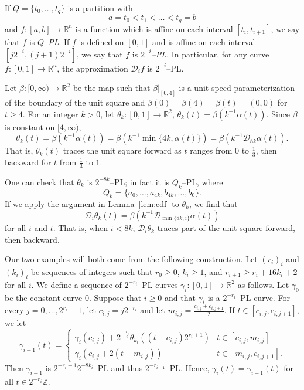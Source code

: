\documentclass[12pt,reqno]{amsart}
\newcommand{\cD}{\mathcal{D}}
\newcommand{\R}{\mathbb{R}}
\newcommand{\Z}{\mathbb{Z}}
\newcommand{\from}{\colon}
\theoremstyle{remark}
\newcommand{\0}{\mathbf{0}}
\renewcommand{\1}{\mathbf 1}
\begin{document}
If $Q = \{t_0,\dots, t_q\}$ is a partition with $$a = t_0 < t_1 <\dots  < t_q = b$$ and $f\from [a,b]\to \R^n$ is a function which is affine on each interval $[t_i,t_{i+1}]$, we say that $f$ is \emph{$Q$--PL}. If $f$ is defined on $[0,1]$ and is affine on each interval $[j2^{-i},(j+1)2^{-i}]$, we say that $f$ is \emph{$2^{-i}$--PL}. In particular, for any curve $f\from [0,1]\to \R^n$, the approximation $\cD_if$ is $2^{-i}$--PL.

Let $\beta\from [0,\infty)\to \R^2$ be the map such that $\beta|_{[0,4]}$ is a unit-speed parameterization of the boundary of the unit square and $\beta(0)=\beta(4) = \beta(t) = (0,0)$ for $t \ge 4$. For an integer $k > 0$, let $\theta_k \from [0,1]\to \R^2$, $\theta_k(t) = \beta(k^{-1} \alpha(t))$. Since $\beta$ is constant on $[4,\infty)$, 
\begin{equation}\label{eq:thetak}
  \theta_k(t) = \beta(k^{-1} \alpha(t)) = \beta(k^{-1} \min\{4k,\alpha(t)\}) = \beta(k^{-1} \cD_{8k}\alpha(t)).
\end{equation}
That is, $\theta_k(t)$ traces the unit square forward as $t$ ranges from $0$ to $\frac{1}{3}$, then backward for $t$ from $\frac{1}{3}$ to $1$.

One can check that $\theta_k$ is $2^{-8k}$--PL; in fact it is $Q_k$--PL, where
$$Q_k = \{a_0,\dots, a_{4k}, b_{4k},\dots, b_0\}.$$
If we apply the argument in Lemma~\ref{lem:cdf} to $\theta_k$, we find that
\begin{equation}\label{eq:cdtheta}
  \cD_i \theta_k(t) = \beta(k^{-1} \cD_{\min\{8k,i\}}\alpha(t))
\end{equation}
for all $i$ and $t$. That is, when $i < 8k$, $\cD_i \theta_k$ traces part of the unit square forward, then backward. 

Our two examples will both come from the following construction.
Let $(r_i)_i$ and $(k_i)_i$ be sequences of integers such that $r_0 \ge 0$, $k_i \ge 1$, and $r_{i+1} \ge r_i + 16 k_i + 2$ for all $i$. We define a sequence of $2^{-r_i}$--PL curves $\gamma_i\from [0,1]\to \R^2$ as follows.
Let $\gamma_0$ be the constant curve $0$. Suppose that $i\ge 0$ and that $\gamma_i$ is a $2^{-r_i}$--PL curve. For every 
$j=0,\dots, 2^{r_i}-1$, let $c_{i,j} = j 2^{-r_i}$ and let $m_{i,j} = \frac{c_{i,j}+ c_{i,j+1}}{2}$. If $t\in [c_{i,j},c_{i,j+1}]$, we let
\begin{equation}\label{eqn:defgammai}
\gamma_{i+1}(t) =
\begin{cases}
  \gamma_i(c_{i,j}) + 2^{-\frac{r_i}{2}} \theta_{k_i}((t-c_{i,j}) 2^{r_i + 1}) & t \in [c_{i,j}, m_{i,j}] \\
  \gamma_i(c_{i,j} + 2(t-m_{i,j})) & t \in [m_{i,j}, c_{i,j+1}].
\end{cases}
\end{equation}
Then $\gamma_{i+1}$ is $2^{-r_i-1}2^{-8k_i}$--PL and thus $2^{-r_{i+1}}$--PL. Hence, $\gamma_i(t) = \gamma_{i+1}(t)$ for all $t\in 2^{-r_i}\Z$.
\end{document}
